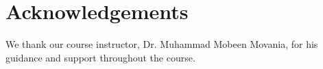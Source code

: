 \documentclass[12pt,a4paper,IEEEtran]{article}
\begin{document}
\begin{figure}[ht]
    \label{fig:overall}
\end{figure}


\section{Acknowledgements}
We thank our course instructor, Dr. Muhammad Mobeen Movania, for his guidance and support throughout the course. 




\end{document}
